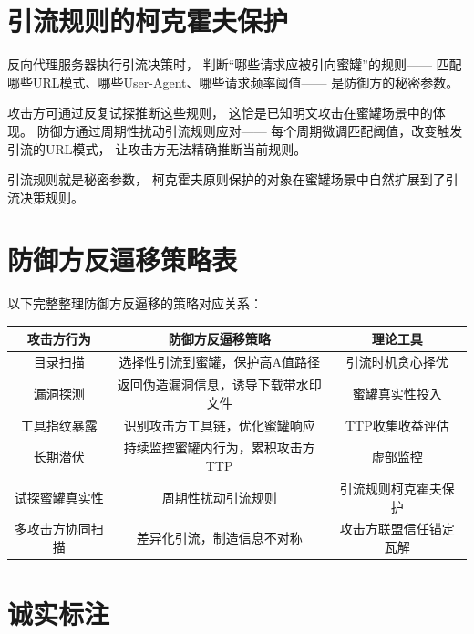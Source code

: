 \documentclass[11pt,a4paper]{article}
\begin{document}
\section{引流规则的柯克霍夫保护}

反向代理服务器执行引流决策时，
判断“哪些请求应被引向蜜罐”的规则——
匹配哪些URL模式、哪些User-Agent、哪些请求频率阈值——
是防御方的秘密参数。

攻击方可通过反复试探推断这些规则，
这恰是已知明文攻击在蜜罐场景中的体现。
防御方通过周期性扰动引流规则应对——
每个周期微调匹配阈值，改变触发引流的URL模式，
让攻击方无法精确推断当前规则。

引流规则就是秘密参数，
柯克霍夫原则保护的对象在蜜罐场景中自然扩展到了引流决策规则。

\section{防御方反逼移策略表}

以下完整整理防御方反逼移的策略对应关系：

\begin{center}
\begin{tabular}{c|c|c}
\toprule
\textbf{攻击方行为} & \textbf{防御方反逼移策略} & \textbf{理论工具} \\
\midrule
目录扫描 & 选择性引流到蜜罐，保护高A值路径 & 引流时机贪心择优 \\
漏洞探测 & 返回伪造漏洞信息，诱导下载带水印文件 & 蜜罐真实性投入 \\
工具指纹暴露 & 识别攻击方工具链，优化蜜罐响应 & TTP收集收益评估 \\
长期潜伏 & 持续监控蜜罐内行为，累积攻击方TTP & 虚部监控 \\
试探蜜罐真实性 & 周期性扰动引流规则 & 引流规则柯克霍夫保护 \\
多攻击方协同扫描 & 差异化引流，制造信息不对称 & 攻击方联盟信任锚定瓦解 \\
\bottomrule
\end{tabular}
\end{center}

\section{诚实标注}
\end{document}
